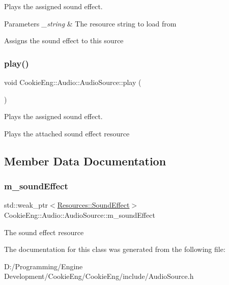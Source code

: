 Plays the assigned sound effect. 


\begin{DoxyParams}{Parameters}
{\em \+\_\+string} & The resource string to load from\\
\hline
\end{DoxyParams}
Assigns the sound effect to this source \mbox{\label{class_cookie_eng_1_1_audio_1_1_audio_source_a077bce5d4bc73b97f261e830558c5350}} 
\subsubsection{\texorpdfstring{play()}{play()}}
{\footnotesize\ttfamily void Cookie\+Eng\+::\+Audio\+::\+Audio\+Source\+::play (\begin{DoxyParamCaption}{ }\end{DoxyParamCaption})}



Plays the assigned sound effect. 

Plays the attached sound effect resource 

\subsection{Member Data Documentation}
\mbox{\label{class_cookie_eng_1_1_audio_1_1_audio_source_af883ecb61be31c5e85f3666934080f4e}} 
\subsubsection{\texorpdfstring{m\+\_\+sound\+Effect}{m\_soundEffect}}
{\footnotesize\ttfamily std\+::weak\+\_\+ptr$<$\hyperlink{class_cookie_eng_1_1_resources_1_1_sound_effect}{Resources\+::\+Sound\+Effect}$>$ Cookie\+Eng\+::\+Audio\+::\+Audio\+Source\+::m\+\_\+sound\+Effect\hspace{0.3cm}{\ttfamily [protected]}}

The sound effect resource 

The documentation for this class was generated from the following file\+:\begin{DoxyCompactItemize}
\item 
D\+:/\+Programming/\+Engine Development/\+Cookie\+Eng/\+Cookie\+Eng/include/Audio\+Source.\+h\end{DoxyCompactItemize}
